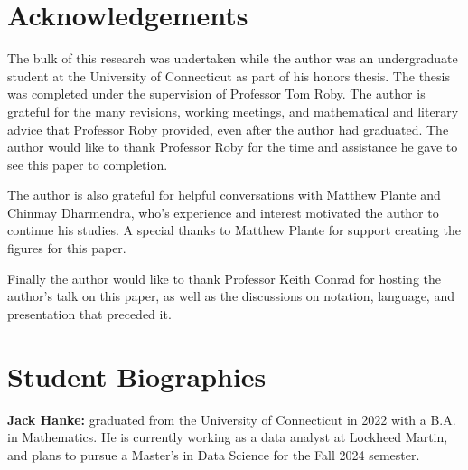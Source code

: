 \documentclass[12pt]{article}
\theoremstyle{plain}
\theoremstyle{definition}
\theoremstyle{remark}
\theoremstyle{definition}
\begin{document}
\newpage

{}


\newpage

\section{Acknowledgements}

\indent The bulk of this research was undertaken while the author was an undergraduate student at the University of Connecticut as part of his honors thesis. The thesis was completed under the supervision of Professor Tom Roby. The author is grateful for the many revisions, working meetings, and mathematical and literary advice that Professor Roby provided, even after the author had graduated. The author would like to thank Professor Roby for the time and assistance he gave to see this paper to completion. 

The author is also grateful for helpful conversations with Matthew Plante and Chinmay Dharmendra, who's experience and interest motivated the author to continue his studies. A special thanks to Matthew Plante for support creating the figures for this paper.

Finally the author would like to thank Professor Keith Conrad for hosting the author's talk on this paper, as well as the discussions on notation, language, and presentation that preceded it. 

\section{Student Biographies}

\textbf{Jack Hanke:} graduated from the University of Connecticut in 2022 with a B.A. in Mathematics. He is currently working as a data analyst at Lockheed Martin, and plans to pursue a Master's in Data Science for the Fall 2024 semester. 
\end{document}
